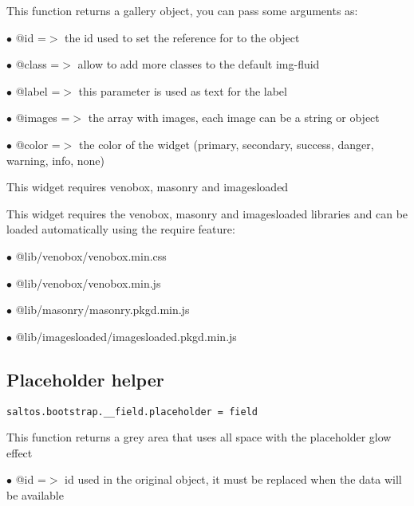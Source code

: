 \documentclass[a4paper]{book}
\begin{document}
This function returns a gallery object, you can pass some arguments as:

\begin{compactitem}
\item[\color{myblue}$\bullet$] @id     =$>$ the id used to set the reference for to the object
\item[\color{myblue}$\bullet$] @class  =$>$ allow to add more classes to the default img-fluid
\item[\color{myblue}$\bullet$] @label  =$>$ this parameter is used as text for the label
\item[\color{myblue}$\bullet$] @images =$>$ the array with images, each image can be a string or object
\item[\color{myblue}$\bullet$] @color  =$>$ the color of the widget (primary, secondary, success, danger, warning, info, none)
\end{compactitem}

This widget requires venobox, masonry and imagesloaded

This widget requires the venobox, masonry and imagesloaded libraries and can be loaded
automatically using the require feature:

\begin{compactitem}
\item[\color{myblue}$\bullet$] @lib/venobox/venobox.min.css
\item[\color{myblue}$\bullet$] @lib/venobox/venobox.min.js
\item[\color{myblue}$\bullet$] @lib/masonry/masonry.pkgd.min.js
\item[\color{myblue}$\bullet$] @lib/imagesloaded/imagesloaded.pkgd.min.js
\end{compactitem}

\hypertarget{toc490}{}
\subsection{Placeholder helper}

\begin{lstlisting}
saltos.bootstrap.__field.placeholder = field
\end{lstlisting}

This function returns a grey area that uses all space with the placeholder glow effect

\begin{compactitem}
\item[\color{myblue}$\bullet$] @id =$>$ id used in the original object, it must be replaced when the data will be available
\end{compactitem}
\end{document}
